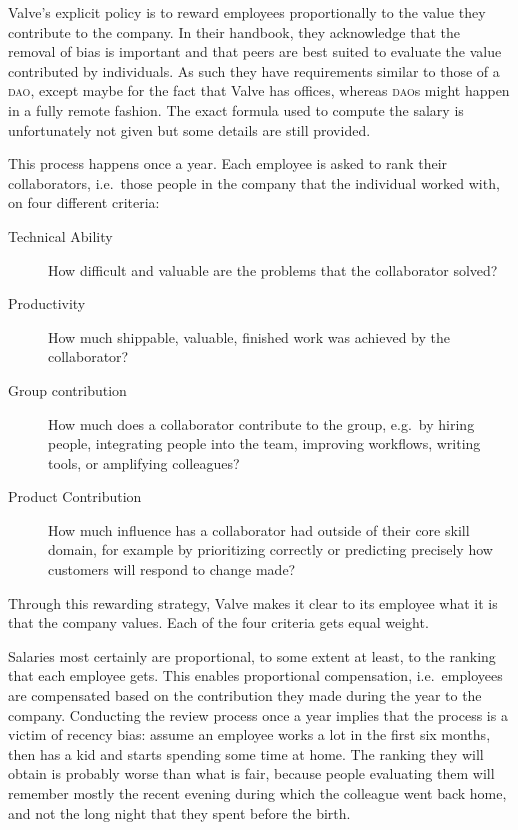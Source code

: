 Valve's explicit policy is to reward employees proportionally to the value they contribute to the company.
In their handbook, they acknowledge that the removal of bias is important and that peers are best suited to evaluate the value contributed by individuals.
As such they have requirements similar to those of a \textsc{dao}, except maybe for the fact that Valve has offices, whereas \textsc{dao}s might happen in a fully remote fashion.
The exact formula used to compute the salary is unfortunately not given but some details are still provided.

This process happens once a year.
%
Each employee is asked to rank their collaborators, i.e.\ those people in the company that the individual worked with, on four different criteria:

\begin{description}
  \item[Technical Ability]
    How difficult and valuable are the problems that the collaborator solved?
  \item[Productivity]
    How much shippable, valuable, finished work was achieved by the collaborator?
  \item[Group contribution]
    How much does a collaborator contribute to the group, e.g.\ by hiring people, integrating people into the team, improving workflows, writing tools, or amplifying colleagues?
  \item[Product Contribution]
    How much influence has a collaborator had outside of their core skill domain, for example by prioritizing correctly or predicting precisely how customers will respond to change made?
\end{description}

%
Through this rewarding strategy, Valve makes it clear to its employee what it is that the company values.
Each of the four criteria gets equal weight.

%
Salaries most certainly are proportional, to some extent at least, to the ranking that each employee gets.
This enables proportional compensation, i.e.\ employees are compensated based on the contribution they made during the year to the company.
Conducting the review process once a year implies that the process is a victim of recency bias: assume an employee works a lot in the first six months, then has a kid and starts spending some time at home.
The ranking they will obtain is probably worse than what is fair, because people evaluating them will remember mostly the recent evening during which the colleague went back home, and not the long night that they spent before the birth.

